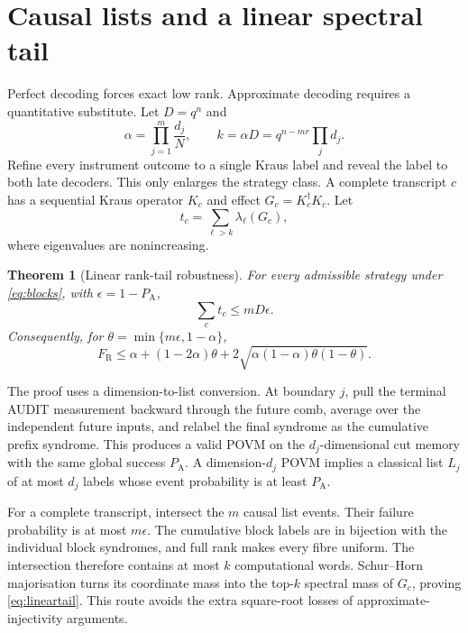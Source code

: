 \documentclass[10pt,twocolumn]{article}
\newtheorem{theorem}{Theorem}[section]
\theoremstyle{remark}
\newcommand{\PA}{P_{\mathrm A}}
\newcommand{\FR}{F_{\mathrm R}}
\begin{document}
\section{Causal lists and a linear spectral tail}
\label{sec:robust}

Perfect decoding forces exact low rank. Approximate decoding requires a
quantitative substitute. Let $D=q^n$ and
\begin{equation}
\alpha=\prod_{j=1}^{m}\frac{d_j}{N},\qquad
k=\alpha D=q^{n-mr}\prod_jd_j.
\label{eq:alphak}
\end{equation}
Refine every instrument outcome to a single Kraus label and reveal the label
to both late decoders. This only enlarges the strategy class. A complete
transcript $c$ has a sequential Kraus operator $K_c$ and effect
$G_c=K_c^\dagger K_c$. Let
\begin{equation}
t_c=\sum_{\ell>k}\lambda_\ell(G_c),
\label{eq:tail}
\end{equation}
where eigenvalues are nonincreasing.

\begin{theorem}[Linear rank-tail robustness]
For every admissible strategy under \eqref{eq:blocks}, with
$\epsilon=1-\PA$,
\begin{equation}
\boxed{\sum_c t_c\leq mD\epsilon.}
\label{eq:lineartail}
\end{equation}
Consequently, for
$\theta=\min\{m\epsilon,1-\alpha\}$,
\begin{equation}
\boxed{
\FR\leq\alpha+(1-2\alpha)\theta
+2\sqrt{\alpha(1-\alpha)\theta(1-\theta)}.}
\label{eq:returnbound}
\end{equation}
\end{theorem}

The proof uses a dimension-to-list conversion. At boundary $j$, pull the
terminal AUDIT measurement backward through the future comb, average over the
independent future inputs, and relabel the final syndrome as the cumulative
prefix syndrome. This produces a valid POVM on the $d_j$-dimensional cut
memory with the same global success $\PA$. A dimension-$d_j$ POVM implies a
classical list $L_j$ of at most $d_j$ labels whose event probability is at
least $\PA$.

For a complete transcript, intersect the $m$ causal list events. Their
failure probability is at most $m\epsilon$. The cumulative block labels are
in bijection with the individual block syndromes, and full rank makes every
fibre uniform. The intersection therefore contains at most $k$ computational
words. Schur--Horn majorisation turns its coordinate mass into the top-$k$
spectral mass of $G_c$, proving \eqref{eq:lineartail}. This route avoids the
extra square-root losses of approximate-injectivity arguments.
\end{document}
